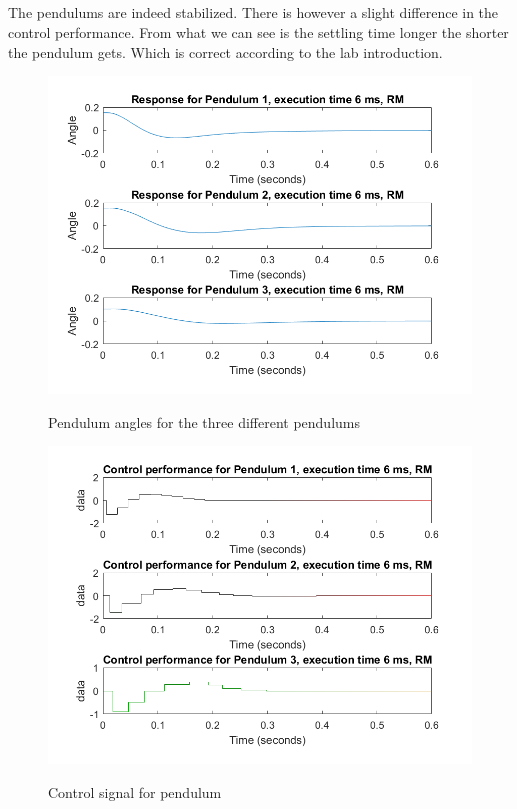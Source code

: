 \documentclass[12pt,a4paper]{article}
\begin{document}
\subsection{}%
 The pendulums are indeed stabilized. There is however a slight difference
 in the control performance. From what we can see is the settling
 time longer the shorter the pendulum gets. Which is correct according to the lab    	introduction. 
  \begin{center}
      \begin{figure}[H]
      \centering
        \includegraphics[scale=0.5]{ex31.png}
        \label{fig:ex31}
        \caption{Pendulum angles for the three different pendulums}
      \end{figure}
    \end{center}
    
    \begin{center}
      \begin{figure}[H]
      \centering
        \includegraphics[scale=0.5]{ex32.png}
        \label{fig:ex32}
      \caption{Control signal for pendulum}
      \end{figure}
    \end{center}
\end{document}

